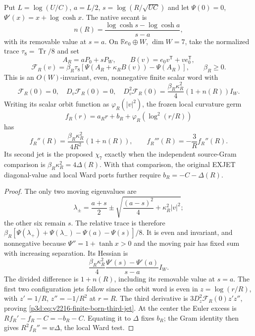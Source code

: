 \documentclass[12pt,a4paper]{article}
\begin{document}
\begin{theorem}
\label{p3d:thm:v2216-finite-born-second-jet}
Put $L=\log(U/C)$, $a=L/2$, $s=\log(R/\sqrt{UC})$ and let
$\Psi(0)=0$, $\Psi'(x)=x+\log\cosh x$. The native secant is
\[
 n(R)=\frac{\log\cosh s-\log\cosh a}{s-a},
\]
with its removable value at $s=a$. On
$\mathbb Re_0\oplus W$, $\dim W=7$, take the normalized trace
$\tau_8=\operatorname{Tr}/8$ and set
\[
 A_R=aP_0+sP_W,\qquad B(v)=e_0v^{\mathsf T}+ve_0^{\mathsf T},
\]
\[
 \mathcal F_R(v)=\beta_R\tau_8
   [\Psi(A_R+\kappa_RB(v))-\Psi(A_R)],\qquad \beta_R\ge0.
\]
This is an $O(W)$-invariant, even, nonnegative finite scalar word with
\begin{equation}
 \mathcal F_R(0)=0,\quad D_v\mathcal F_R(0)=0,\quad
 D_v^2\mathcal F_R(0)=\frac{\beta_R\kappa_R^2}{4}(1+n(R))I_W.
 \label{p3d:eq:v2216-finite-born-hessian}
\end{equation}
Writing its scalar orbit function as $\varphi_R(|v|^2)$, the frozen
local curvature germ
\[
 f_R(r)=a_Rr+b_R+\varphi_R(\log^2(r/R))
\]
has
\begin{equation}
 f_R''(R)=\frac{\beta_R\kappa_R^2}{4R^2}(1+n(R)),\qquad
 f_R'''(R)=-\frac3R f_R''(R).
 \label{p3d:eq:v2216-finite-born-third-jet}
\end{equation}
Its second jet is the proposed $\chi_7$ exactly when the independent
source-Gram comparison is $\beta_R\kappa_R^2=4\Delta(R)$. With that
comparison, the original EXJET diagonal-value and local Ward ports further
require $b_R=-C-\Delta(R)$.
\end{theorem}
\begin{proof}
The only two moving eigenvalues are
\[
 \lambda_\pm=\frac{a+s}{2}\pm
       \sqrt{\frac{(a-s)^2}{4}+\kappa_R^2|v|^2};
\]
the other six remain $s$. The relative trace is therefore
$\beta_R[\Psi(\lambda_+)+\Psi(\lambda_-)-\Psi(a)-\Psi(s)]/8$.
It is even and invariant, and nonnegative because
$\Psi''=1+\tanh x>0$ and the moving pair has fixed sum with increasing
separation. Its Hessian is
\[
 \frac{\beta_R\kappa_R^2}{4}
       \frac{\Psi'(s)-\Psi'(a)}{s-a}I_W.
\]
The divided difference is $1+n(R)$, including its removable value at
$s=a$. The first two configuration jets follow since the orbit word is
even in $z=\log(r/R)$, with $z'=1/R$, $z''=-1/R^2$ at $r=R$.
The third derivative is $3D_z^2\mathcal F_R(0)z'z''$, proving
\eqref{p3d:eq:v2216-finite-born-third-jet}. At the center the Euler
excess is $Rf_R'-f_R-C=-b_R-C$. Equating it to $\Delta$ fixes $b_R$;
the Gram identity then gives $R^2f_R''=w\Delta$, the local Ward test.
\end{proof}
\end{document}

